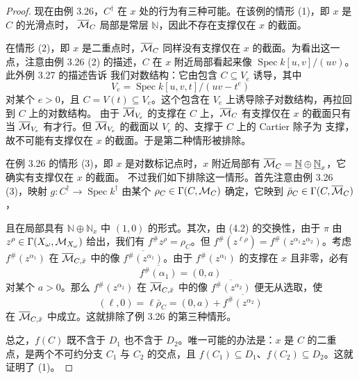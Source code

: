 \begin{proof}
现在由例 3.26，$C^{\dagger}$ 在 $x$ 处的行为有三种可能。在该例的情形 (1)，即 $x$ 是 $C$ 的光滑点时，
$\overline{\mathcal{M}}_C$ 局部是常层 $\underline{\mathbb{N}}$，因此不存在支撑仅在 $x$ 的截面。

在情形 (2)，即 $x$ 是二重点时，$\overline{\mathcal{M}}_C$ 同样没有支撑仅在 $x$ 的截面。为看出这一点，注意由例
3.26 (2) 的描述，$C$ 在 $x$ 附近局部看起来像 $\operatorname{Spec}k[u,v]/(uv)$。此外例 3.27 的描述告诉
我们对数结构：它由包含 $C \subseteq V_e$ 诱导，其中
\[
V_e = \operatorname{Spec}k[u,v,t]/(uv-t^e)
\]
对某个 $e>0$，且 $C = V(t)\subseteq V_e$。这个包含在 $V_e$ 上诱导除子对数结构，再拉回到 $C$ 上的对数结构。
由于 $\overline{\mathcal{M}}_{V_e}$ 的支撑在 $C$ 上，$\overline{\mathcal{M}}_C$ 有支撑仅在 $x$ 的截面只有当
$\overline{\mathcal{M}}_{V_e}$ 有才行。但 $\overline{\mathcal{M}}_{V_e}$ 的截面以 $V_e$ 的、支撑于 $C$ 上的 Cartier 除子为
支撑，故不可能有支撑仅在 $x$ 的截面。于是第二种情形被排除。

在例 3.26 的情形 (3)，即 $x$ 是对数标记点时，$x$ 附近局部有
$\overline{\mathcal{M}}_C = \underline{\mathbb{N}}\oplus\underline{\mathbb{N}}_x$，它确实有支撑仅在 $x$ 的截面。
不过我们如下排除这一情形。首先注意由例 3.26 (3)，映射 $g : C^{\dagger} \to \operatorname{Spec}k^{\dagger}$
由某个 $\rho_C \in \Gamma(C,\mathcal{M}_C)$ 确定，它映到 $\bar\rho_C \in \Gamma(C,\overline{\mathcal{M}}_C)$，

且在局部具有 $\mathbb{N}\oplus\mathbb{N}_x$ 中 $(1,0)$ 的形式。其次，由 (4.2) 的交换性，由于 $\pi$ 由
$z^{\rho}\in\Gamma(X_\omega,\mathcal{M}_{X_\omega})$ 给出，我们有 $f^{\#}z^{\rho} = \rho_C$。但
$f^{\#}(z^{\ell\rho}) = f^{\#}(z^{\alpha_1}z^{\alpha_2})$。考虑 $f^{\#}(z^{\alpha_1})$ 在
$\overline{\mathcal{M}}_{C,\bar x}$ 中的像 $\overline{f^{\#}(z^{\alpha_1})}$。由于 $f^{\#}(z^{\alpha_1})$ 的支撑在 $x$
且非零，必有
\[
\overline{f^{\#}(\alpha_1)} = (0,a)
\]
对某个 $a>0$。那么 $f^{\#}(z^{\alpha_2})$ 在 $\overline{\mathcal{M}}_{C,\bar x}$ 中的像
$\overline{f^{\#}(z^{\alpha_2})}$ 便无从选取，使
\[
(\ell,0) = \ell\bar\rho_C = (0,a)+\overline{f^{\#}(z^{\alpha_2})}
\]
在 $\overline{\mathcal{M}}_{C,\bar x}$ 中成立。这就排除了例 3.26 的第三种情形。

总之，$f(C)$ 既不含于 $D_1$ 也不含于 $D_2$。唯一可能的办法是：$x$ 是 $C$ 的二重点，是两个不可约分支
$C_1$ 与 $C_2$ 的交点，且 $f(C_1)\subseteq D_1$、$f(C_2)\subseteq D_2$。这就证明了 (1)。


\end{proof}

